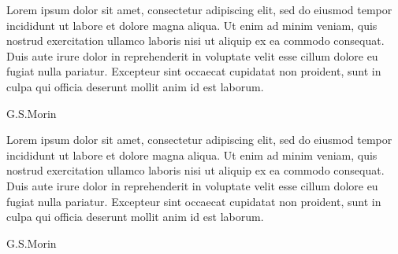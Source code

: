 \documentclass[10pt,letterpaper,sans]{moderncv} %
\begin{document}
\epigraph{Lorem ipsum dolor sit amet, consectetur adipiscing elit, sed do eiusmod tempor incididunt ut labore et dolore magna aliqua. Ut enim ad minim veniam, quis nostrud exercitation ullamco laboris nisi ut aliquip ex ea commodo consequat. Duis aute irure dolor in reprehenderit in voluptate velit esse cillum dolore eu fugiat nulla pariatur. Excepteur sint occaecat cupidatat non proident, sunt in culpa qui officia deserunt mollit anim id est laborum.}{G.S.Morin}

\epigraph{Lorem ipsum dolor sit amet, consectetur adipiscing elit, sed do eiusmod tempor incididunt ut labore et dolore magna aliqua. Ut enim ad minim veniam, quis nostrud exercitation ullamco laboris nisi ut aliquip ex ea commodo consequat. Duis aute irure dolor in reprehenderit in voluptate velit esse cillum dolore eu fugiat nulla pariatur. Excepteur sint occaecat cupidatat non proident, sunt in culpa qui officia deserunt mollit anim id est laborum.}{G.S.Morin}

\end{document}
